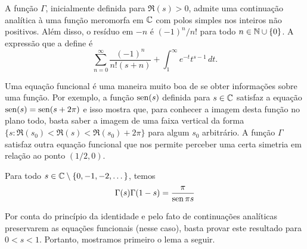     \begin{teorema}
    \label{teo-cont-meromorfa-gamma2}
        A função $\Gamma$, inicialmente definida para $\Re(s) > 0$, admite uma continuação analítica à uma função meromorfa em $\mathbb{C}$ com polos simples nos inteiros não positivos. Além disso, o resíduo em $-n$ é $(-1)^{n}/n!$ para todo $n \in \mathbb{N} \cup \{0\}$. A expressão que a define é
        $$\sum_{n=0}^{\infty} \frac{(-1)^n}{n!(s+n)} + \int_{1}^{\infty}e^{-t}t^{s-1} \, dt.$$
    \end{teorema}
    
    Uma equação funcional é uma maneira muito boa de se obter informações sobre uma função. Por exemplo, a função $\operatorname{sen}(s)$ definida para $s \in \mathbb{C}$ satisfaz a equação $\operatorname{sen}(s) = \operatorname{sen}(s + 2\pi)$ e isso mostra que, para conhecer a imagem desta função no plano todo, basta saber a imagem de uma faixa vertical da forma $\{s : \Re(s_0) < \Re(s) < \Re(s_0) + 2\pi\}$ para algum $s_0$ arbitrário. A função $\Gamma$ satisfaz outra equação funcional que nos permite perceber uma certa simetria em relação ao ponto $(1/2,0)$. 
    
    \begin{teorema}
    Para todo $s \in \mathbb{C} \setminus \{0,-1,-2, \dots\}$, temos 
    $$\Gamma(s)\Gamma(1-s) = \frac{\pi}{\operatorname{sen} \pi s}$$
    \end{teorema}
    
    Por conta do princípio da identidade e pelo fato de continuações analíticas preservarem as equações funcionais (nesse caso), basta provar este resultado para $0<s<1$. Portanto, mostramos primeiro o lema a seguir.
    
